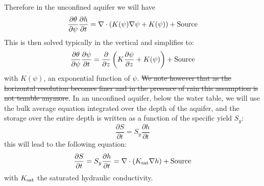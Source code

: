 \documentclass{article}
\begin{document}
Therefore in the unconfined aquifer we will have 
\begin{equation}
     \frac{\partial \theta}{\partial \psi}\frac{\partial h}{\partial t} = \nabla \cdot \left( {K(\psi) \nabla \psi} + K(\psi) \right) + {\rm Source}
\label{Richards_simple_uns}
\end{equation}
This is then solved typically in the vertical and simplifies to:
\begin{equation}
     \frac{\partial \theta}{\partial \psi}\frac{\partial \psi}{\partial t} = \frac{\partial}{\partial z}  \left( {K \frac{\partial \psi}{\partial z} + K(\psi)} \right) + {\rm Source}
\label{Richards_simple_uns_1D}
\end{equation}
with $K(\psi)$, an exponential function of $\psi$.
\st{We note however that as the horizontal resolution becomes finer and in the presence of rain this assumption is not tenable anymore}.
In an unconfined aquifer, below the water table, we will use the bulk average equation integrated over the depth of the aquifer, and the storage over the entire depth is written as a function of the specific yield $S_y$:
\begin{equation}
     \frac{\partial S}{\partial t} = S_y \frac{\partial h}{\partial t}  
\end{equation}
this will lead to the following equation:
\begin{equation}
     \frac{\partial S}{\partial t} = S_y \frac{\partial h}{\partial t} = \nabla \cdot \left( {K_{\rm sat} \nabla h} \right) + {\rm Source}
\label{Richards_simple}
\end{equation}
with $K_{\rm sat}$ the saturated hydraulic conductivity. 
\end{document}

